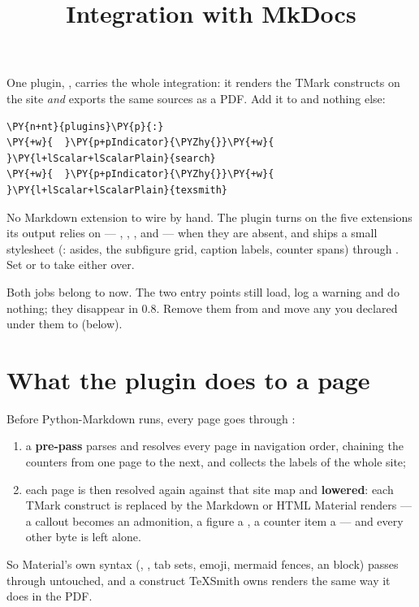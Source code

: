 \documentclass[a4paper,twoside]{article}
\title{Integration with MkDocs}
\author{}\date{}
\begin{document}
\maketitle
One plugin, , carries the whole integration: it renders the TMark
constructs on the site \emph{and} exports the same sources as a PDF. Add it to
 and nothing else:
\begin{tscode}[lang=yaml, engine=pygments]
\begin{Verbatim}[commandchars=\\\{\},breaklines, breakanywhere, commandchars=\\\{\}]
\PY{n+nt}{plugins}\PY{p}{:}
\PY{+w}{  }\PY{p+pIndicator}{\PYZhy{}}\PY{+w}{ }\PY{l+lScalar+lScalarPlain}{search}
\PY{+w}{  }\PY{p+pIndicator}{\PYZhy{}}\PY{+w}{ }\PY{l+lScalar+lScalarPlain}{texsmith}
\end{Verbatim}
\end{tscode}
No Markdown extension to wire by hand. The plugin turns on the five extensions
its output relies on --- , , ,
 and  --- when they are absent, and ships
a small stylesheet (: asides, the subfigure grid,
caption labels, counter spans) through . Set
 or  to take either over.
\begin{tscallout}[kind=warning, title={The \tscodeinline{texsmith.counters} and \tscodeinline{texsmith.index} plugins are gone}]
Both jobs belong to  now. The two entry points still load, log a
warning and do nothing; they disappear in 0.8. Remove them from 
and move any  you declared under them to 
(below).
\end{tscallout}
\section{What the plugin does to a page}
Before Python-Markdown runs, every page goes through :
\begin{enumerate}
\item a \textbf{pre-pass} parses and resolves every page in navigation order, chaining
the counters from one page to the next, and collects the labels of the whole
site;
\item each page is then resolved again against that site map and \textbf{lowered}: each
TMark construct is replaced by the Markdown or HTML Material renders --- a
callout becomes an admonition, a figure a , a counter item a
 --- and every other byte is left alone.
\end{enumerate}
So Material's own syntax (, , tab sets, emoji,
mermaid fences, an  block) passes through untouched, and a
construct TeXSmith owns renders the same way it does in the PDF.
\end{document}
